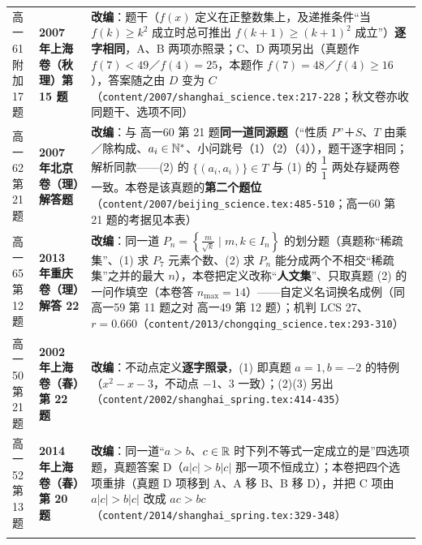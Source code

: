 \documentclass[a4paper,11pt]{article}
\begin{document}
\begin{xltabular}{\textwidth}{@{}>{\raggedright\arraybackslash}p{2.85cm}>{\raggedright\arraybackslash}p{3.99cm}>{\raggedright\arraybackslash}p{7.89cm}@{}}
高一61 附加 17 题 & \textbf{2007 年上海卷（秋理）第 15 题} & \textbf{改编}：题干（\(f(x)\) 定义在正整数集上，及递推条件``当 \(f(k)\geqslant\allowbreak  k^2\) 成立时总可推出 \(f(k+\allowbreak 1)\geqslant\allowbreak (k+\allowbreak 1)^2\) 成立''）\textbf{逐字相同}，A、B 两项亦照录；C、D 两项另出（真题作 \(f(7)<49\)／\(f(4)=\allowbreak 25\)，本题作 \(f(7)=\allowbreak 48\)／\(f(4)\geqslant\allowbreak 16\)），答案随之由 \(D\) 变为 \(C\)（\texttt{content/\allowbreak{}2007/\allowbreak{}shanghai\_science.tex:217-\allowbreak{}228}；秋文卷亦收同题干、选项不同） \\ \addlinespace[1pt]
高一62 第 21 题 & \textbf{2007 年北京卷（理）解答题} & \textbf{改编}：与 高一60 第 21 题\textbf{同一道同源题}（``性质 \(P\)''＋\(S\)、\(T\) 由乘／除构成、\(a_i\in\mathbb{N}^*\)、小问跳号（1）（2）（4）），题干逐字相同；解析同款------(2) 的 \(\{(a_i,a_i)\}\in T\) 与 (1) 的 \(\dfrac{1}{1}\) 两处存疑两卷一致。本卷是该真题的\textbf{第二个题位}（\texttt{content/\allowbreak{}2007/\allowbreak{}beijing\_science.tex:485-\allowbreak{}510}；高一60 第 21 题的考据见本表） \\ \addlinespace[1pt]
高一65 第 12 题 & \textbf{2013 年重庆卷（理）解答 22} & \textbf{改编}：同一道 \(P_n=\allowbreak \left\{\frac m{\sqrt k}\mid\allowbreak  m,k\in I_n\right\}\) 的划分题（真题称``稀疏集''、(1) 求 \(P_7\) 元素个数、(2) 求 \(P_n\) 能分成两个不相交``稀疏集''之并的最大 \(n\)），本卷把定义改称``\textbf{人文集}''、只取真题 (2) 的一问作填空（本卷答 \(n_{\max}=\allowbreak 14\)）------自定义名词换名成例（同 高一59 第 11 题之对 高一49 第 12 题）；机判 LCS 27、\(r=\allowbreak 0.660\)（\texttt{content/\allowbreak{}2013/\allowbreak{}chongqing\_science.tex:293-\allowbreak{}310}） \\ \addlinespace[1pt]
高一50 第 21 题 & \textbf{2002 年上海卷（春）第 22 题} & \textbf{改编}：不动点定义\textbf{逐字照录}，(1) 即真题 \(a=\allowbreak 1,b=\allowbreak -2\) 的特例（\(x^2-x-3\)，不动点 \(-1\)、\(3\) 一致）；(2)(3) 另出（\texttt{content/\allowbreak{}2002/\allowbreak{}shanghai\_spring.tex:414-\allowbreak{}435}） \\ \addlinespace[1pt]
高一52 第 13 题 & \textbf{2014 年上海卷（春）第 20 题} & \textbf{改编}：同一道``\(a>b\)、\(c\in\mathbb{R}\) 时下列不等式一定成立的是''四选项题，真题答案 D（\(a\lvert c\rvert>b\lvert c\rvert\) 那一项不恒成立）；本卷把四个选项重排（真题 D 项移到 A、A 移 B、B 移 D），并把 C 项由 \(a\lvert c\rvert>b\lvert c\rvert\) 改成 \(ac>bc\)（\texttt{content/\allowbreak{}2014/\allowbreak{}shanghai\_spring.tex:329-\allowbreak{}348}） \\ \addlinespace[1pt]

\end{xltabular}
\end{document}
